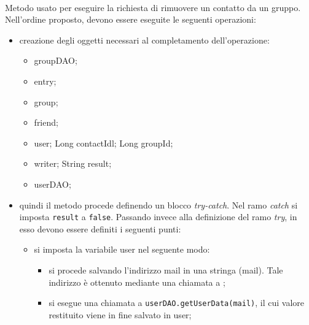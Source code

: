 \begin{description}
	\item{}\\	
	Metodo usato per eseguire la richiesta di rimuovere un contatto da un gruppo. Nell'ordine proposto, devono essere eseguite le seguenti operazioni:
	\begin{itemize}
		\item creazione degli oggetti necessari al completamento dell'operazione:
		\begin{itemize}
			\item {} groupDAO;
			\item {} entry;
			\item {} group;
			\item {} friend;
			\item {} user;
			Long contactIdl;
			Long groupId;
			\item {} writer;
			String result;
			\item {} userDAO;
		\end{itemize}
		
		\item quindi il metodo procede definendo un blocco \textit{try-catch}. Nel ramo \textit{catch} si imposta \texttt{result} a \texttt{false}. Passando invece alla definizione del ramo \textit{try}, in esso devono essere definiti i seguenti punti:
		\begin{itemize}
			\item si imposta la variabile user nel seguente modo:
			\begin{itemize}
				\item si procede salvando l'indirizzo mail in una stringa (mail). Tale indirizzo è ottenuto mediante una chiamata a ;
				\item si esegue una chiamata a \texttt{userDAO.getUserData(mail)}, il cui valore restituito viene in fine salvato in user;
			\end{itemize}
			

\end{itemize}
\end{itemize}
\end{description}
